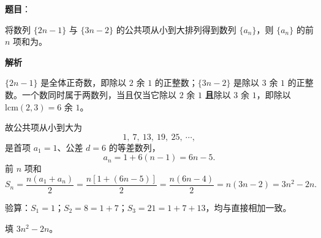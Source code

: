 \begin{answer}

\textbf{题目}：

将数列 $\{2n-1\}$ 与 $\{3n-2\}$ 的公共项从小到大排列得到数列 $\{a_n\}$，则 $\{a_n\}$ 的前 $n$ 项和为\gkblank{}。

\textbf{解析}

$\{2n-1\}$ 是全体正奇数，即除以 $2$ 余 $1$ 的正整数；$\{3n-2\}$ 是除以 $3$ 余 $1$ 的正整数。一个数同时属于两数列，当且仅当它除以 $2$ 余 $1$ \textbf{且}除以 $3$ 余 $1$，即除以 $\mathrm{lcm}(2,3)=6$ 余 $1$。

故公共项从小到大为
\nopagebreak[4]
\[1,\ 7,\ 13,\ 19,\ 25,\ \cdots,\]
是首项 $a_1=1$、公差 $d=6$ 的等差数列，
\nopagebreak[4]
\[a_n=1+6(n-1)=6n-5 .\]
前 $n$ 项和
\nopagebreak[4]
\[S_n=\frac{n(a_1+a_n)}2=\frac{n\left[1+(6n-5)\right]}2=\frac{n(6n-4)}2=n(3n-2)=3n^2-2n .\]

验算：$S_1=1$；$S_2=8=1+7$；$S_3=21=1+7+13$，均与直接相加一致。

填 $3n^2-2n$。


\end{answer}
